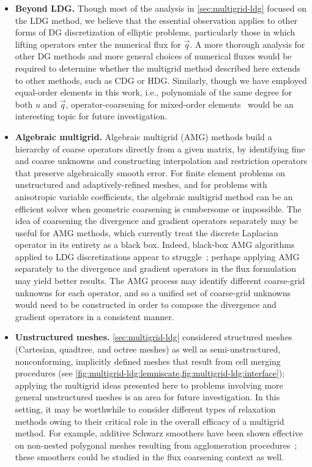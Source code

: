 \vspace{0.2em}
\begin{itemize}

\item \textbf{Beyond LDG.} Though most of the analysis in \cref{sec:multigrid-ldg} focused on the LDG method, we believe that the essential observation applies to other forms of DG discretization of elliptic problems, particularly those in which lifting operators enter the numerical flux for $\vec q$. A more thorough analysis for other DG methods and more general choices of numerical fluxes would be required to determine whether the multigrid method described here extends to other methods, such as CDG or HDG. Similarly, though we have employed equal-order elements in this work, i.e., polynomials of the same degree for both $u$ and $\vec q$, operator-coarsening for mixed-order elements~\cite{Brezzi_05_01} would be an interesting topic for future investigation.

\item \textbf{Algebraic multigrid.} Algebraic multigrid (AMG) methods build a hierarchy of coarse operators directly from a given matrix, by identifying fine and coarse unknowns and constructing interpolation and restriction operators that preserve algebraically smooth error. For finite element problems on unstructured and adaptively-refined meshes, and for problems with anisotropic variable coefficients, the algebraic multigrid method can be an efficient solver when geometric coarsening is cumbersome or impossible. The idea of coarsening the divergence and gradient operators separately may be useful for AMG methods, which currently treat the discrete Laplacian operator in its entirety as a black box. Indeed, black-box AMG algorithms applied to LDG discretizations appear to struggle~\cite{Olson_11_01}; perhaps applying AMG separately to the divergence and gradient operators in the flux formulation may yield better results. The AMG process may identify different coarse-grid unknowns for each operator, and so a unified set of coarse-grid unknowns would need to be constructed in order to compose the divergence and gradient operators in a consistent manner.

\item \textbf{Unstructured meshes.} \cref{sec:multigrid-ldg} considered structured meshes (Cartesian, quadtree, and octree meshes) as well as semi-unstructured, nonconforming, implicitly defined meshes that result from cell merging procedures (see \cref{fig:multigrid-ldg:lemniscate,fig:multigrid-ldg:interface}); applying the multigrid ideas presented here to problems involving more general unstructured meshes is an area for future investigation. In this setting, it may be worthwhile to consider different types of relaxation methods owing to their critical role in the overall efficacy of a multigrid method. For example, additive Schwarz smoothers have been shown effective on non-nested polygonal meshes resulting from agglomeration procedures~\cite{Antonietti_19_01}; these smoothers could be studied in the flux coarsening context as well.

\end{itemize}


